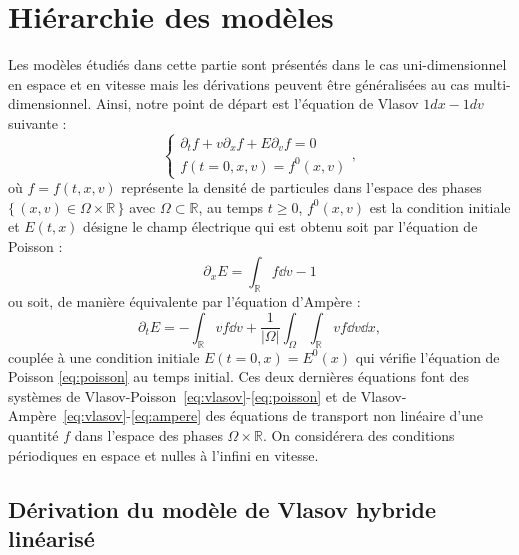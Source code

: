 
\section{Hiérarchie des modèles}
\label{s:models}
Les modèles étudiés dans cette partie sont présentés dans le cas uni-dimensionnel en espace et en vitesse mais les dérivations peuvent être généralisées au cas multi-dimensionnel. Ainsi, notre point de départ est l'équation de Vlasov $1dx-1dv$ suivante :
\begin{equation}
  \begin{cases}
    \partial_t f + v\partial_x f + E\partial_v f = 0\\
    f(t=0, x, v)=f^0(x,v)
  \end{cases},
  \label{eq:vlasov}
\end{equation}
où $f=f(t,x,v)$ représente la densité de particules dans l'espace des phases $\{\,(x,v)\in\Omega\times\mathbb{R}\,\}$ avec $\Omega\subset\mathbb{R}$, au temps $t\geq 0$, $f^0(x,v)$ est la condition initiale et $E(t, x)$ désigne le champ électrique qui est obtenu soit par l'équation de Poisson :
\begin{equation}
  \partial_x E = \int_{\mathbb{R}} f \dd{v} - 1
  \label{eq:poisson}
\end{equation}
ou soit, de manière équivalente par l'équation d'Ampère :
\begin{equation}
  \partial_t E = -\int_{\mathbb{R}} vf \dd{v} + \frac{1}{|\Omega|}\int_\Omega \int_{\mathbb{R}} vf \dd{v} \dd{x},
  \label{eq:ampere}
\end{equation}
couplée à une condition initiale $E(t=0,x)=E^0(x)$ qui vérifie l'équation de Poisson \eqref{eq:poisson} au temps initial. Ces deux dernières équations font des systèmes de Vlasov-Poisson~\eqref{eq:vlasov}-\eqref{eq:poisson} et de Vlasov-Ampère~\eqref{eq:vlasov}-\eqref{eq:ampere} des équations de transport non linéaire d'une quantité $f$ dans l'espace des phases $\Omega\times\mathbb{R}$. On considérera des conditions périodiques en espace et nulles à l'infini en vitesse. 

\subsection{Dérivation du modèle de Vlasov hybride linéarisé}
\label{sec:2:vhl}


